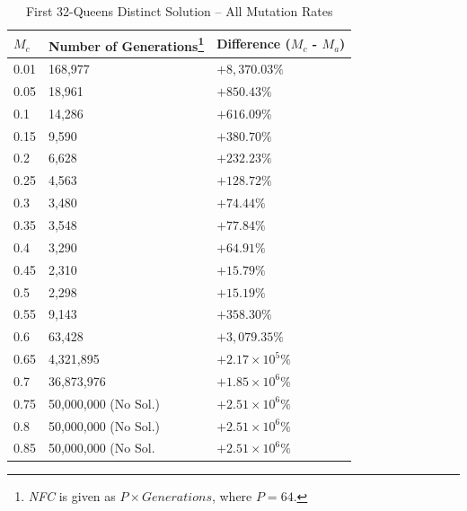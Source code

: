 \documentclass[conference]{IEEEtran}
\begin{document}
\begin{table}
\caption{First 32-Queens Distinct Solution -- All Mutation Rates}
\begin{minipage}{\columnwidth}%
\centering
\renewcommand\footnoterule{ \kern -2ex}
\renewcommand{\thempfootnote}{\fnsymbol{mpfootnote}}
{\renewcommand{\arraystretch}{1.2}
\begin{tabular}{|l|l|l|} \hline
$M_{c}$&         Number of Generations\footnote{\emph{NFC} is given as $P \times Generations$, where $P = 64$.}&                        Difference ($M_{c}$ - $M_{a}$)\\ \hline
0.01&            168,977&                    $ +8,370.03\% $ \\ \hline
0.05&            18,961&                     $ +850.43\% $ \\ \hline
0.1&             14,286&                     $ +616.09\% $ \\ \hline
0.15&            9,590&                      $ +380.70\% $ \\ \hline
0.2&             6,628&                      $ +232.23\% $ \\ \hline
0.25&            4,563&                      $ +128.72\% $ \\ \hline
0.3&             3,480&                      $ +74.44\% $ \\ \hline
0.35&            3,548&                      $ +77.84\% $ \\ \hline
0.4&             3,290&                      $ +64.91\% $ \\ \hline
0.45&            2,310&                      $ +15.79\% $ \\ \hline
0.5&             2,298&                      $ +15.19\% $ \\ \hline
0.55&            9,143&                      $ +358.30\% $ \\ \hline
0.6&             63,428&                     $ +3,079.35\% $ \\ \hline
0.65&            4,321,895&                  $ +2.17\times10^{5}\% $ \\ \hline
0.7&             36,873,976&                 $ +1.85\times10^{6}\% $ \\ \hline
0.75&            50,000,000 (No Sol.)&       $ +2.51\times10^{6}\% $ \\ \hline
0.8&             50,000,000 (No Sol.)&       $ +2.51\times10^{6}\% $ \\ \hline
0.85&            50,000,000 (No Sol.&        $ +2.51\times10^{6}\% $ \\ \hline

\end{tabular}}
\end{minipage}
\end{table}
\end{document}

